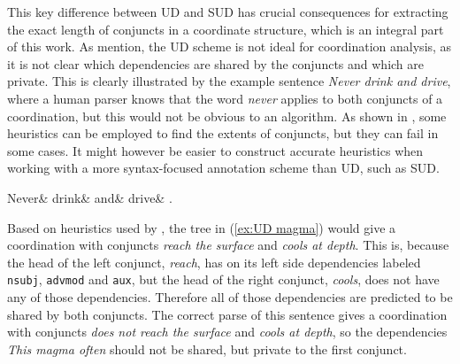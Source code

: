 \begin{exe}
    \ex
    \label{ex:distribution Mary}
    \begin{xlist}
    \end{xlist}
\end{exe}

This key difference between UD and SUD has crucial consequences for extracting the exact length of conjuncts in a coordinate structure, which is an integral part of this work. As \cite{prz:woz:23} mention, the UD scheme is not ideal for coordination analysis, as it is not clear which dependencies are shared by the conjuncts and which are private. This is clearly illustrated by the example sentence \textsl{Never drink and drive}, where a human parser knows that the word \textsl{never} applies to both conjuncts of a coordination, but this would not be obvious to an algorithm. As shown in \cite{pbg2023}, some heuristics can be employed to find the extents of conjuncts, but they can fail in some cases. It might however be easier to construct accurate heuristics when working with a more syntax-focused annotation scheme than UD, such as SUD. 

\begin{exe}
\ex\label{ex:drink-and-drive}
\begin{dependency}[baseline=-\the\dimexpr\fontdimen22\textfont2\relax]
	\begin{deptext}
		Never\& drink\& and\& drive\& .\\
	\end{deptext}
\end{dependency}
\end{exe}

Based on heuristics used by \cite{pbg2023}, the tree in (\ref{ex:UD magma}) would give a coordination with conjuncts \textsl{reach the surface} and \textsl{cools at depth}. This is, because the head of the left conjunct, \textsl{reach}, has on its left side dependencies labeled \texttt{nsubj}, \texttt{advmod} and \texttt{aux}, but the head of the right conjunct, \textsl{cools}, does not have any of those dependencies. Therefore all of those dependencies are predicted to be shared by both conjuncts. The correct parse of this sentence gives a coordination with conjuncts \textsl{does not reach the surface} and \textsl{cools at depth}, so the dependencies \textsl{This magma often} should not be shared, but private to the first conjunct. 


